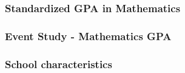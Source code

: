 \documentclass{beamer}
\begin{document}
\begin{frame}
    \label{update_scott}
    \frametitle{Standardized GPA in Mathematics}
        {
    }
\end{frame}

\begin{frame}
    \label{update_scott}
    \frametitle{Event Study - Mathematics GPA}
        {
    }
\end{frame}

\begin{frame}
    \label{update_scott}
    \frametitle{School characteristics}
 {
    }
\end{frame}
\end{document}
